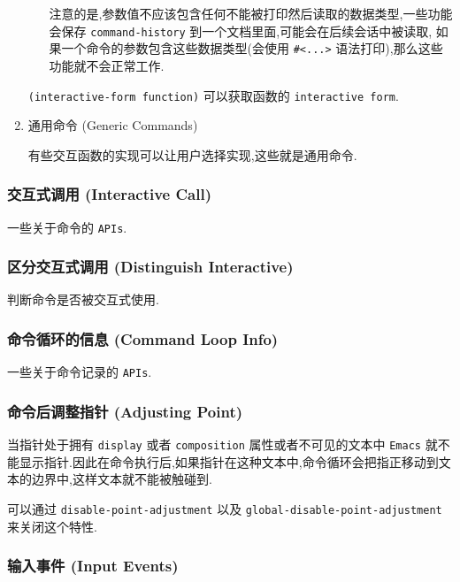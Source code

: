 \documentclass[11pt]{article}
\begin{document}
\begin{enumerate}
\begin{itemize}
注意的是,参数值不应该包含任何不能被打印然后读取的数据类型,一些功能会保存 \texttt{command-history} 到一个文档里面,可能会在后续会话中被读取,
如果一个命令的参数包含这些数据类型(会使用 \texttt{\#<...>} 语法打印),那么这些功能就不会正常工作.
\end{itemize}

\texttt{(interactive-form function)} 可以获取函数的 \texttt{interactive form}.


\item 通用命令 (Generic Commands)
\label{sec:org519a5f7}

有些交互函数的实现可以让用户选择实现,这些就是通用命令.
\end{enumerate}


\subsubsection{交互式调用 (Interactive Call)}
\label{sec:org9800bbe}

一些关于命令的 \texttt{APIs}.


\subsubsection{区分交互式调用 (Distinguish Interactive)}
\label{sec:org271e83a}

判断命令是否被交互式使用.


\subsubsection{命令循环的信息 (Command Loop Info)}
\label{sec:org31e06fd}

一些关于命令记录的 \texttt{APIs}.


\subsubsection{命令后调整指针 (Adjusting Point)}
\label{sec:orgb0fa99b}

当指针处于拥有 \texttt{display} 或者 \texttt{composition} 属性或者不可见的文本中 \texttt{Emacs} 就不能显示指针.因此在命令执行后,如果指针在这种文本中,命令循环会把指正移动到文本的边界中,这样文本就不能被触碰到.

可以通过 \texttt{disable-point-adjustment} 以及 \texttt{global-disable-point-adjustment} 来关闭这个特性.


\subsubsection{输入事件 (Input Events)}
\label{sec:org50de2fa}
\end{document}
